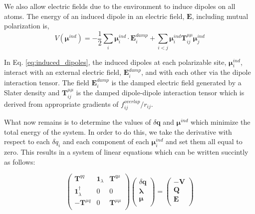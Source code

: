 \documentclass[journal=jacsat,manuscript=article]{achemso}
\begin{document}
We also allow electric fields due to the environment to induce dipoles on all atoms.
The energy of an induced dipole in an electric field, $\bm{E}$, including mutual polarization is,
\begin{equation}
  V(\bm{\mu}^{ind})=-\frac12\sum_i \bm{\mu}_i^{ind}\cdot \bm{E}_i^{damp} + \sum_{i<j}\bm{\mu}^{ind}_i \bm{T}^{\mu\mu}_{ij}\bm{\mu}^{ind}_j
  \label{eq:induced_dipoles}
\end{equation}

In Eq. \ref{eq:induced_dipoles}, the induced dipoles at each polarizable site, $\bm{\mu}_i^{ind}$,
interact with an external electric field, $\bm{E}_i^{damp}$, and with each other via the dipole interaction tensor.
The field $\bm{E}_i^{damp}$ is the damped electric field generated by a Slater density
and $\bm{T}^{\mu\mu}_{ij}$ is the damped dipole-dipole interaction tensor which is derived from appropriate
gradients of $f_{ij}^{overlap}/r_{ij}$.

What now remains is to determine the values of $\delta \bm{q}$ and $\bm{\mu}^{ind}$
which minimize the total energy of the system. In order to do this, we take
the derivative with respect to each $\delta q_i$ and each component of each
$\bm{\mu}_i^{ind}$ and set them all equal to zero. This results in a system of linear
equations which can be written succintly as follows:


\begin{equation}
  \begin{pmatrix}
    \bm{T}^{qq} & \bm{1}_\lambda & \bm{T}^{q\mu} \\
    \bm{1}_\lambda^\dagger & 0 & 0 \\
    -\bm{T}^{\mu q} & 0 & \bm{T}^{\mu\mu} \\
  \end{pmatrix}
  \begin{pmatrix}
    \delta \bm{q} \\
    \bm{\lambda} \\
    \bm{\mu} \\
  \end{pmatrix}
  =
  \begin{pmatrix}
    -\bm{V} \\
    \bm{Q} \\
    \bm{E} \\
  \end{pmatrix}
  \label{eq:pol_mat}
\end{equation}
\end{document}
